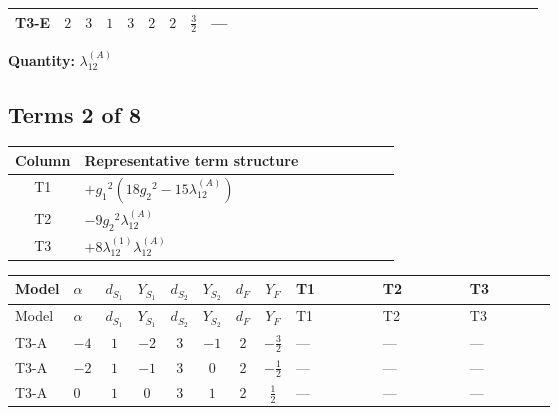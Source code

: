 \documentclass[8pt]{article}
\begin{document}
\begin{landscape}
\begin{longtable}{@{}llcccccc >{\raggedright\arraybackslash}p{0.21\linewidth} >{\raggedright\arraybackslash}p{0.21\linewidth} >{\raggedright\arraybackslash}p{0.21\linewidth}@{}}
\midrule
T3-E & $2$ & $3$ & $1$ & $3$ & $2$ & $2$ & $\frac{3}{2}$ & --- & \scriptsize\adjustbox{max width=\linewidth}{$\begin{gathered} +\frac{2}{3} \operatorname{Tr}\!\left({y_1}\,\left({y_1}\right)^{\dagger}\,{y_2}\,\left({y_2}\right)^{\dagger}\right)\end{gathered}$} & \scriptsize\adjustbox{max width=\linewidth}{$\begin{gathered} -\frac{2}{9} {\lambda_5} \left({\lambda_5}\right)^{*}\end{gathered}$} \\
\midrule
\bottomrule
\end{longtable}
\clearpage
\noindent\textbf{Quantity: }$\lambda_{12}^{(A)}$\par\smallskip
\subsection*{Terms 2 of 8}
\begin{center}
\begin{tabular}{@{}c >{\raggedright\arraybackslash}p{0.82\linewidth}@{}}
\toprule
Column & Representative term structure \\
\midrule
T1 & \(\displaystyle +{g_1}^2 \left(18 {g_2}^2-15 {\lambda_{12}^{(A)}}\right)\) \\
\midrule
T2 & \(\displaystyle -9 {g_2}^2 {\lambda_{12}^{(A)}}\) \\
\midrule
T3 & \(\displaystyle +8 {\lambda_{12}^{(1)}} {\lambda_{12}^{(A)}}\) \\
\midrule
\bottomrule
\end{tabular}
\end{center}
\smallskip
\tiny
\begin{longtable}{@{}llcccccc >{\raggedright\arraybackslash}p{0.21\linewidth} >{\raggedright\arraybackslash}p{0.21\linewidth} >{\raggedright\arraybackslash}p{0.21\linewidth}@{}}
\toprule
Model & $\alpha$ & $d_{S_1}$ & $Y_{S_1}$ & $d_{S_2}$ & $Y_{S_2}$ & $d_F$ & $Y_F$ & T1 & T2 & T3 \\
\midrule
\endfirsthead
\toprule
Model & $\alpha$ & $d_{S_1}$ & $Y_{S_1}$ & $d_{S_2}$ & $Y_{S_2}$ & $d_F$ & $Y_F$ & T1 & T2 & T3 \\
\midrule
\endhead
T3-A & $-4$ & $1$ & $-2$ & $3$ & $-1$ & $2$ & $-\frac{3}{2}$ & --- & --- & --- \\
\midrule
T3-A & $-2$ & $1$ & $-1$ & $3$ & $0$ & $2$ & $-\frac{1}{2}$ & --- & --- & --- \\
\midrule
T3-A & $0$ & $1$ & $0$ & $3$ & $1$ & $2$ & $\frac{1}{2}$ & --- & --- & --- \\

\end{longtable}
\end{landscape}
\end{document}

